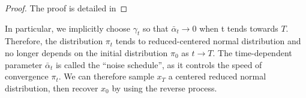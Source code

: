 \documentclass[a4paper,10pt]{article}
\begin{document}
\begin{proof}
    The proof is detailed in 
\end{proof}
In particular, we implicitly choose $\gamma_t$ so that $\bar \alpha_t \rightarrow 0$ when t tends towards $T$. Therefore, the distribution $\pi_t$ tends to reduced-centered normal distribution and no longer depends on the initial  distribution $\pi_0$ as $t \rightarrow T$. The time-dependent parameter $\bar \alpha_t$ is called the “noise schedule”, as it controls the speed of convergence $\pi_t$. We can therefore sample $x_T$ a centered reduced normal distribution, then recover $x_0$ by using the reverse process.



\end{document}
